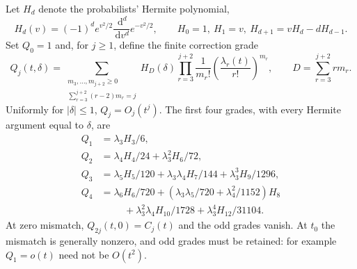 \documentclass[11pt]{article}
\theoremstyle{remark}\newtheorem{remark}[theorem]{Remark}
\newcommand{\dd}{\,\mathrm d}
\numberwithin{equation}{section}
\begin{document}
Let $H_d$ denote the probabilists' Hermite polynomial,
\[
 H_d(v)=(-1)^d e^{v^2/2}\frac{\dd^d}{\dd v^d}e^{-v^2/2},
 \qquad H_0=1,\ H_1=v,\ H_{d+1}=vH_d-dH_{d-1}.
\]
Set $Q_0=1$ and, for $j\ge1$, define the finite correction grade
\begin{equation}\label{udp:eq:Qj}
 Q_j(t,\delta)=
 \sum_{\substack{m_3,\ldots,m_{j+2}\ge0\\\sum_{r=3}^{j+2}(r-2)m_r=j}}
 H_D(\delta)\prod_{r=3}^{j+2}\frac1{m_r!}
 \left(\frac{\lambda_r(t)}{r!}\right)^{m_r},
 \qquad D=\sum_{r=3}^{j+2}rm_r.
\end{equation}
Uniformly for $|\delta|\le1$, $Q_j=O_j(t^j)$. The first four grades, with every Hermite argument equal to $\delta$, are
\begin{align}
 Q_1&=\lambda_3H_3/6,\nonumber\\
 Q_2&=\lambda_4H_4/24+\lambda_3^2H_6/72,\nonumber\\
 Q_3&=\lambda_5H_5/120+\lambda_3\lambda_4H_7/144+\lambda_3^3H_9/1296,\label{udp:eq:Qexamples}\\
 Q_4&=\lambda_6H_6/720+
       (\lambda_3\lambda_5/720+\lambda_4^2/1152)H_8\nonumber\\
 &\hspace{1cm}+\lambda_3^2\lambda_4H_{10}/1728
       +\lambda_3^4H_{12}/31104.\nonumber
\end{align}
At zero mismatch, $Q_{2j}(t,0)=C_j(t)$ and the odd grades vanish. At $t_0$ the mismatch is generally nonzero, and odd grades must be retained: for example $Q_1=o(t)$ need not be $O(t^2)$.
\end{document}
